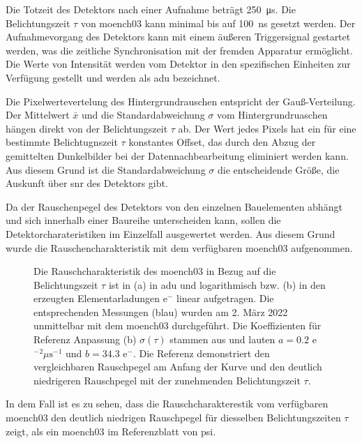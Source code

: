 \noindent
Die Totzeit des Detektors nach einer Aufnahme beträgt \SI{250}{\micro\second}. Die Belichtungszeit $\tau$ von \gls{moench03} kann minimal bis auf \SI{100}{\nano\second} gesetzt werden. Der Aufnahmevorgang des Detektors kann mit einem äußeren Triggersignal gestartet werden, was die zeitliche Synchronisation mit der fremden Apparatur ermöglicht. Die Werte von Intensität werden vom Detektor in den spezifischen Einheiten zur Verfügung gestellt und werden als \gls{adu} bezeichnet.

\noindent
Die Pixelwertevertelung des Hintergrundrauschen entspricht der Gauß-Verteilung. Der Mittelwert $\bar{x}$ und die Standardabweichung $\sigma$ vom Hintergrundruaschen hängen direkt von der Belichtungszeit $\tau$ ab. Der Wert jedes Pixels hat ein für eine bestimmte Belichtugnszeit $\tau$ konstantes Offset, das durch den Abzug der gemittelten Dunkelbilder bei der Datennachbearbeitung eliminiert werden kann. Aus diesem Grund ist die Standardabweichung $\sigma$ die entscheidende Größe, die Auskunft über \gls{snr} des Detektors gibt.

\noindent
Da der Rauschenpegel des Detektors von den einzelnen Bauelementen abhängt und sich innerhalb einer Baureihe unterscheiden kann, sollen die  Detektorcharateristiken im Einzelfall ausgewertet werden. Aus diesem Grund wurde die Rauschencharakteristik mit dem verfügbaren \gls{moench03} aufgenommen.
\begin{figure}[H]
    \centering
    
    \caption{Die Rauschcharakteristik des \gls{moench03} in Bezug auf die Belichtungszeit $\tau$ ist in (a) in \gls{adu} und logarithmisch bzw. (b) in den erzeugten Elementarladungen e$^-$ linear aufgetragen. Die entsprechenden Messungen (blau) wurden am 2. März 2022 unmittelbar mit dem \gls{moench03} durchgeführt. Die Koeffizienten für Referenz Anpassung (b) $\sigma(\tau)$ stammen aus \cite{ramilli-measurements-2017} und lauten $a=\num{0,2}$ e${^-}^2\mu \text{s}^{-1}$ und $b=\num{34.3}$ e${^-}$. Die Referenz demonstriert den vergleichbaren Rauschpegel am Anfang der Kurve und den deutlich niedrigeren Rauschpegel mit der zunehmenden Belichtungszeit $\tau$.}
    \label{fig:noise_moench}
\end{figure}
\noindent
In dem Fall ist es zu sehen, dass die Rauschcharakterestik vom verfügbaren \gls{moench03} den deutlich niedrigen Rauschpegel für diesselben Belichtungszeiten $\tau$ zeigt, als ein \gls{moench03} im Referenzblatt \cite{ramilli-measurements-2017} von \gls{psi}.

